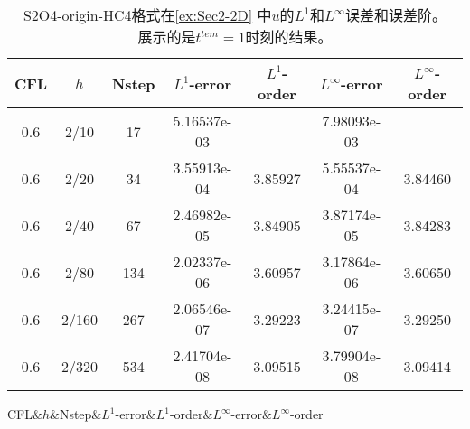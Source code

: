 \def\titleintable{CFL&$h$&Nstep&$L^1$-error&$L^1$-order&$L^\infty$-error&$L^\infty$-order\\}
\begin{table}[htbp]
  \caption{S2O4-origin-HC4格式在\cref{ex:Sec2-2D} 中$u$的$L^1$和$L^\infty$误差和误差阶。\\展示的是$t^{tem} = 1$时刻的结果。}
  \label{ta:ex2_2}
  \centering
  \begin{tabular}{ccccccc}
    \toprule
    \titleintable
    \midrule
    0.6 & 2/10  & 17  & 5.16537e-03 &         & 7.98093e-03 &         \\
    0.6 & 2/20  & 34  & 3.55913e-04 & 3.85927 & 5.55537e-04 & 3.84460 \\
    0.6 & 2/40  & 67  & 2.46982e-05 & 3.84905 & 3.87174e-05 & 3.84283 \\
    0.6 & 2/80  & 134 & 2.02337e-06 & 3.60957 & 3.17864e-06 & 3.60650 \\
    0.6 & 2/160 & 267 & 2.06546e-07 & 3.29223 & 3.24415e-07 & 3.29250 \\
    0.6 & 2/320 & 534 & 2.41704e-08 & 3.09515 & 3.79904e-08 & 3.09414 \\
    \bottomrule
  \end{tabular}
\end{table}
\undef\titleintable